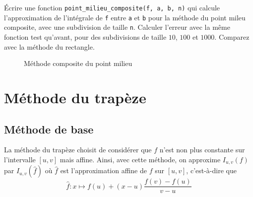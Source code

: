 \quessques Écrire une fonction \texttt{point\_milieu\_composite(f, a, b, n)} qui calcule l'approximation de l'intégrale de \texttt{f} entre \texttt{a} et \texttt{b} pour la méthode du point mileu composite, avec une subdivision de taille \texttt{n}.
\ssques Calculer l'erreur avec la même fonction test qu'avant, pour des subdivisions de taille $ 10 $, $ 100 $ et $ 1000 $. Comparez avec la méthode du rectangle.

\begin{figure}[h!]
    \centering

    \caption{Méthode composite du point milieu}
    \label{fig:point-milieu-composite-method}
\end{figure}


\section{Méthode du trapèze}
\subsection{Méthode de base}
La méthode du trapèze choisit de considérer que $ f $ n'est non plus constante sur l'intervalle $ [u, v] $ mais affine. Ainsi, avec cette méthode, on approxime $ I_{u,v}(f) $ par $ I_{u,v}(\hat{f}) $ où $ \hat{f} $ est l'approximation affine de $ f $ sur $ [u, v] $, c'est-à-dire que \[
    \hat{f} : x \mapsto f(u) + (x-u) \frac{f(v)-f(u)}{v-u}
\]

